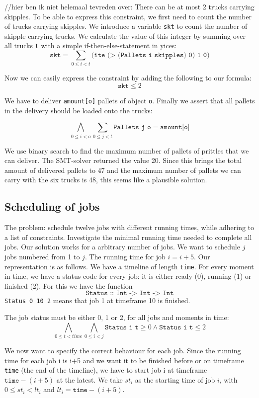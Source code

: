 \documentclass[12pt]{article}
\begin{document}
//hier ben ik niet helemaal tevreden over:
There can be at most 2 trucks carrying skipples. To be able to express this constraint, we first need to count the number of trucks carrying skipples. We introduce a variable \texttt{skt} to count the number of skipple-carrying trucks. We calculate the value of this integer by summing over all trucks \texttt{t} with a simple if-then-else-statement in yices: 
\[ \texttt{skt} = \sum_{0\le i < t} \texttt{(ite (> (Pallets i skipples) 0) 1 0)}\]

Now we can easily express the constraint by adding the following to our formula:
\[ \texttt{skt} \le 2 \]

We have to deliver \texttt{amount[o]} pallets of object \texttt{o}. Finally we assert that all pallets in the delivery should be loaded onto the trucks:

\[ \bigwedge_{0 \le i < o} \sum_{0 \le j < t} \texttt{Pallets j o} = \texttt{amount[o]}\]

We use binary search to find the maximum number of pallets of prittles that we can deliver. The SMT-solver returned the value 20. Since this brings the total amount of delivered pallets to 47 and the maximum number of pallets we can carry with the six trucks is 48, this seems like a plausible solution.

\subsection*{Scheduling of jobs}
The problem: schedule twelve jobs with different running times, while adhering to a list of constraints. Investigate the minimal running time needed to complete all jobs.
Our solution works for a arbitrary number of jobs. We want to schedule $j$ jobs numbered from 1 to $j$. The running time for job $i = i+5$.
Our representation is as follows. We have a timeline of length \texttt{time}. For every moment in time, we have a status code for every job: it is either ready (0), running (1) or finished (2). 
For this we have the function 
\[\texttt{Status :: Int -> Int -> Int}\]
\texttt{Status 0 10 2} means that job 1 at timeframe 10 is finished. 

The job status must be either 0, 1 or 2, for all jobs and moments in time:
\[ \bigwedge_{0 \le t < time} \bigwedge_{0 \le i < j} \texttt{Status i t} \ge 0\wedge \texttt{Status i t} \le 2\]

We now want to specify the correct behaviour for each job. 
Since the running time for each job i is i+5 and we want it to be finished before or on timeframe \texttt{time} (the end of the timeline), we have to start job i at timeframe $\texttt{time}-(i+5)$ at the latest.
We take $st_i$ as the starting time of job $i$, with $0 \le st_i < lt_i$ and $lt_i = \texttt{time}-(i+5)$.
\end{document}
